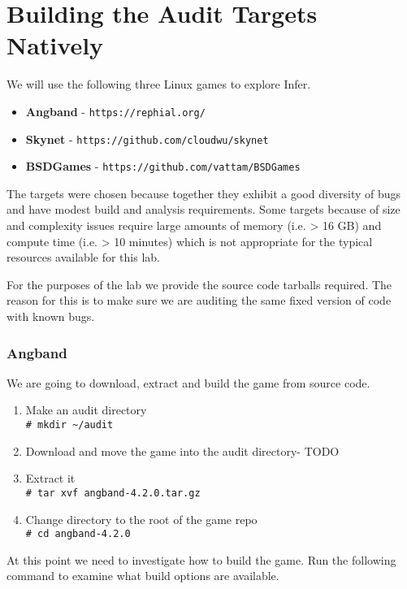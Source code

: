\section{Building the Audit Targets Natively}

We will use the following three Linux games to explore Infer.

\begin{itemize}
	\itemsep0em 
	\item \textbf{Angband} - \verb|https://rephial.org/|
	\item \textbf{Skynet} - \verb|https://github.com/cloudwu/skynet|
	\item \textbf{BSDGames} - \verb|https://github.com/vattam/BSDGames|
\end{itemize}

The targets were chosen because together they exhibit a good diversity of bugs
and have modest build and analysis requirements. 
Some targets because of size and complexity issues require large amounts of 
memory (i.e. > 16 GB) and compute time (i.e. > 10 minutes) which is not appropriate
for the typical resources available for this lab.

For the purposes of the lab we provide the source code tarballs required. The reason
for this is to make sure we are auditing the same fixed version of code with known bugs.

\subsubsection{Angband}

We are going to download, extract and build the game from source code.


\begin{enumerate}
	\itemsep0em
	\item Make an audit directory\\
	\verb|# mkdir ~/audit|
	\item Download and move the game into the audit directory- TODO 
	\item Extract it\\
	\verb|# tar xvf angband-4.2.0.tar.gz|
	\item Change directory to the root of the game repo	\\
	\verb|# cd angband-4.2.0|	
\end{enumerate}

At this point we need to investigate how to build the game.
Run the following command to examine what build options are available.

